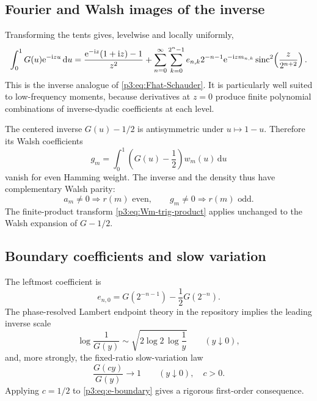 \documentclass[11pt]{article}
\theoremstyle{definition}
\theoremstyle{remark}
\newcommand{\dd}{\,\mathrm d}
\begin{document}
\subsection{Fourier and Walsh images of the inverse}

Transforming the tents gives, levelwise and locally uniformly,
\begin{equation}\label{p3:eq:Ghat-Schauder}
 \int_0^1G(u)\e^{-\ii zu}\dd u
 =\frac{\e^{-\ii z}(1+\ii z)-1}{z^2}
 +\sum_{n=0}^\infty\sum_{k=0}^{2^n-1}
 e_{n,k}2^{-n-1}\e^{-\ii zm_{n,k}}
 \sinc^2\!\left(\frac{z}{2^{n+2}}\right).
\end{equation}
This is the inverse analogue of \eqref{p3:eq:Fhat-Schauder}.  It is particularly
well suited to low-frequency moments, because derivatives at $z=0$ produce
finite polynomial combinations of inverse-dyadic coefficients at each level.

The centered inverse $G(u)-1/2$ is antisymmetric under $u\mapsto1-u$.
Therefore its Walsh coefficients
\begin{equation}\label{p3:eq:G-Walsh-coeff}
 g_m=\int_0^1\left(G(u)-\frac12\right)w_m(u)\dd u
\end{equation}
vanish for even Hamming weight.  The inverse and the density thus have
complementary Walsh parity:
\begin{equation}\label{p3:eq:complementary-Walsh-parity}
 a_m\ne0\Rightarrow r(m)\text{ even},
 \qquad
 g_m\ne0\Rightarrow r(m)\text{ odd}.
\end{equation}
The finite-product transform \eqref{p3:eq:Wm-trig-product} applies unchanged to
the Walsh expansion of $G-1/2$.

\subsection{Boundary coefficients and slow variation}

The leftmost coefficient is
\begin{equation}\label{p3:eq:e-boundary}
 e_{n,0}=G(2^{-n-1})-\frac12G(2^{-n}).
\end{equation}
The phase-resolved Lambert endpoint theory in the repository implies the
leading inverse scale
\begin{equation}\label{p3:eq:G-leading-log}
 \log\frac1{G(y)}
 \sim\sqrt{2\log2\,\log\frac1y}
 \qquad(y\downarrow0),
\end{equation}
and, more strongly, the fixed-ratio slow-variation law
\begin{equation}\label{p3:eq:G-slow-variation}
 \frac{G(cy)}{G(y)}\longrightarrow1
 \qquad(y\downarrow0),\quad c>0.
\end{equation}
Applying $c=1/2$ to \eqref{p3:eq:e-boundary} gives a rigorous first-order
consequence.
\end{document}
